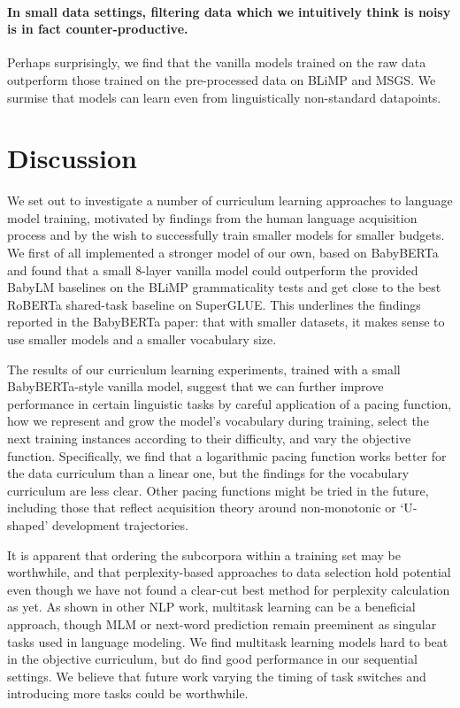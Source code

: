 \paragraph{In small data settings, filtering data which we intuitively think is noisy is in fact counter-productive.} Perhaps surprisingly, we find that the vanilla models trained on the raw data outperform those trained on the pre-processed data on BLiMP and MSGS. We surmise that models can learn even from linguistically non-standard datapoints.

\section{Discussion}\label{sec:discussion}

We set out to investigate a number of curriculum learning approaches to language model training, motivated by findings from the human language acquisition process and by the wish to successfully train smaller models for smaller budgets.
We first of all implemented a stronger model of our own, based on BabyBERTa \cite{huebner2021babyberta} and found that a small 8-layer vanilla model could outperform the provided BabyLM baselines on the BLiMP grammaticality tests and get close to the best RoBERTa shared-task baseline on SuperGLUE. This underlines the findings reported in the BabyBERTa paper: that with smaller datasets, it makes sense to use smaller models and a smaller vocabulary size.

The results of our curriculum learning experiments, trained with a small BabyBERTa-style vanilla model, suggest that we can further improve performance in certain linguistic tasks by careful application of a pacing function, how we represent and grow the model's vocabulary during training, select the next training instances according to their difficulty, and vary the objective function. Specifically, we find that a logarithmic pacing function works better for the data curriculum than a linear one, but the findings for the vocabulary curriculum are less clear. Other pacing functions might be tried in the future, including those that reflect acquisition theory around non-monotonic or `U-shaped' development trajectories.

It is apparent that ordering the subcorpora within a training set may be worthwhile, and that perplexity-based approaches to data selection hold potential even though we have not found a clear-cut best method for perplexity calculation as yet. As shown in other NLP work, multitask learning can be a beneficial approach, though MLM or next-word prediction remain preeminent as singular tasks used in language modeling. We find multitask learning models hard to beat in the objective curriculum, but do find good performance in our sequential settings. We believe that future work varying the timing of task switches and introducing more tasks could be worthwhile.

